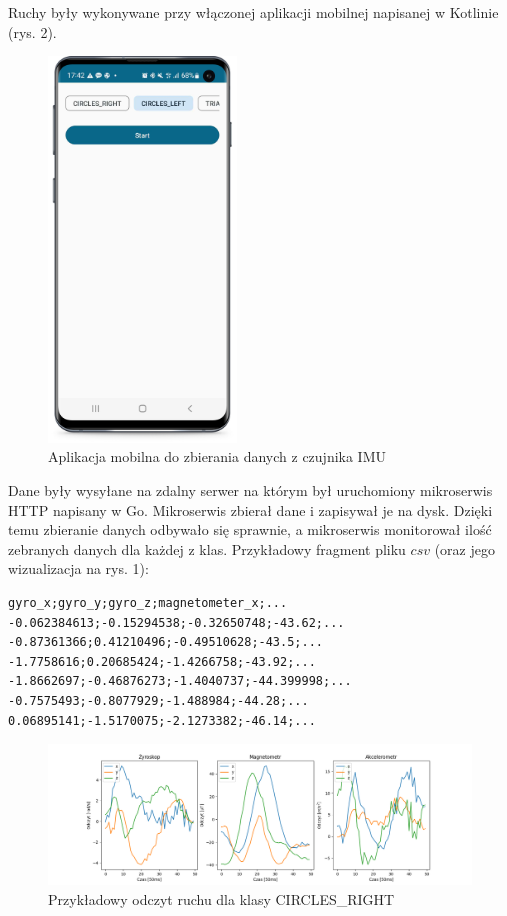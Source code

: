 \documentclass[10pt]{article}
\begin{document}
Ruchy były wykonywane przy włączonej aplikacji mobilnej napisanej w Kotlinie (rys. 2).

\begin{figure}[h]
\label{fig:screenshot}
\includegraphics[width=5cm]{s1.png}
\centering
\caption{Aplikacja mobilna do zbierania danych z czujnika IMU}
\end{figure}

Dane były wysyłane na zdalny serwer na którym był uruchomiony mikroserwis HTTP napisany w Go. Mikroserwis zbierał dane i zapisywał je na dysk. Dzięki temu zbieranie danych odbywało się sprawnie, a mikroserwis monitorował ilość zebranych danych dla każdej z klas. Przykładowy fragment pliku $csv$ (oraz jego wizualizacja na rys. 1):

\begin{verbatim}  
gyro_x;gyro_y;gyro_z;magnetometer_x;...
-0.062384613;-0.15294538;-0.32650748;-43.62;...
-0.87361366;0.41210496;-0.49510628;-43.5;...
-1.7758616;0.20685424;-1.4266758;-43.92;...
-1.8662697;-0.46876273;-1.4040737;-44.399998;...
-0.7575493;-0.8077929;-1.488984;-44.28;...
0.06895141;-1.5170075;-2.1273382;-46.14;...
\end{verbatim}


\begin{figure}[H]
  \includegraphics[width=16cm]{sample.png}
  \centering
  \caption{Przykładowy odczyt ruchu dla klasy CIRCLES\_RIGHT}
\end{figure}
\end{document}
